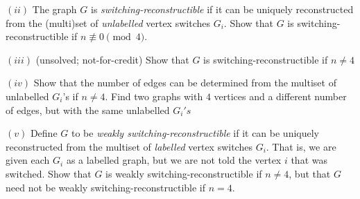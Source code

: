 \documentclass[10pt]{article}
\begin{document}
$(ii)$ The graph $G$ is \emph{switching-reconstructible} if it can be uniquely reconstructed from the (multi)set of \emph{unlabelled} vertex switches $G_i$. Show that $G$ is switching-reconstructible if $n\not\equiv 0 \pmod 4$.\medskip

$(iii)$ (unsolved; not-for-credit) Show that $G$ is switching-reconstructible if $n\neq 4$\medskip

$(iv)$ Show that the number of edges can be determined from the multiset of unlabelled $G_i$'s if $n\neq 4$. Find two graphs with $4$ vertices and a different number of edges, but with the same unlabelled $G_i's$\medskip

$(v)$ Define $G$ to be \emph{weakly switching-reconstructible} if it can be uniquely reconstructed from the multiset of \emph{labelled} vertex switches $G_i$. That is, we are given each $G_i$ as a labelled graph, but we are not told the vertex $i$ that was switched. Show that $G$ is weakly switching-reconstructible if $n\neq 4$, but that $G$ need not be weakly switching-reconstructible if $n=4$.\\
\end{document}

